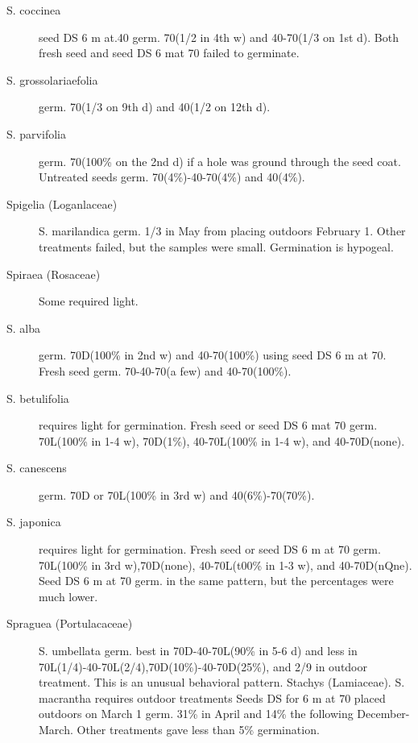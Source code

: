 \begin{description}
\item[S. coccinea] seed DS 6 m at.40 germ. 70(1/2 in 4th w) and 40-70(1/3 on 1st d).
Both fresh seed and seed DS 6 mat 70 failed to germinate.
\item[S. grossolariaefolia] germ. 70(1/3 on 9th d) and 40(1/2 on 12th d).
\item[S. parvifolia] germ. 70(100\% on the 2nd d) if a hole was ground through the
seed coat. Untreated seeds germ. 70(4\%)-40-70(4\%) and 40(4\%).

\item[Spigelia (Loganlaceae)] S. marilandica germ. 1/3 in May from placing
outdoors February 1. Other treatments failed, but the samples were small.
Germination is hypogeal.

\item[Spiraea (Rosaceae)] Some required light.
\item[S. alba] germ. 70D(100\% in 2nd w) and 40-70(100\%) using seed DS 6 m at 70.
Fresh seed germ. 70-40-70(a few) and 40-70(100\%).
\item[S. betulifolia] requires light for germination. Fresh seed or seed DS 6 mat 70
germ. 70L(100\% in 1-4 w), 70D(1\%), 40-70L(100\% in 1-4 w), and 40-70D(none).
\item[S. canescens] germ. 70D or 70L(100\% in 3rd w) and 40(6\%)-70(70\%).
\item[S. japonica] requires light for germination. Fresh seed or seed DS 6 m at 70
germ. 70L(100\% in 3rd w),70D(none), 40-70L(t00\% in 1-3 w), and 40-70D(nQne).
Seed DS 6 m at 70 germ. in the same pattern, but the percentages were much lower.

\item[Spraguea (Portulacaceae)] S. umbellata germ. best in 70D-40-70L(90\%
in 5-6 d) and less in 70L(1/4)-40-70L(2/4),70D(10\%)-40-70D(25\%), and 2/9 in
outdoor treatment. This is an unusual behavioral pattern.
Stachys (Lamiaceae). S. macrantha requires outdoor treatments Seeds DS
for 6 m at 70 placed outdoors on March 1 germ. 31\% in April and 14\% the following
December-March. Other treatments gave less than 5\% germination.


\end{description}
